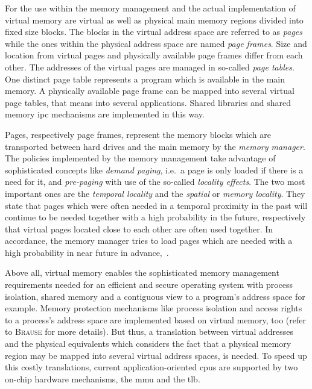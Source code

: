 %
For the use within the memory management and the actual implementation of virtual memory are virtual as well as physical main memory regions divided into fixed size blocks.
The blocks in the virtual address space are referred to as \textit{pages} while the ones within the physical address space are named \textit{page frames}.
Size and location from virtual pages and physically available page frames differ from each other. 
The addresses of the virtual pages are managed in so-called \textit{page tables}.
One distinct page table represents a program which is available in the main memory\cite{brause2017betriebssysteme}.
A physically available page frame can be mapped into several virtual page tables, that means into several applications.
Shared libraries and shared memory \ac{ipc} mechanisms are implemented in this way\cite{brause2017betriebssysteme}.

Pages, respectively page frames, represent the memory blocks which are transported between hard drives and the main memory by the \textit{memory manager}.
The policies implemented by the memory management take advantage of sophisticated concepts like \textit{demand paging}, i.e.\ a page is only loaded if there is a need for it, and \textit{pre-paging} with use of the so-called \textit{locality effects}.
The two most important ones are the \textit{temporal locality} and the \textit{spatial} or \textit{memory locality}.
They state that pages which were often needed in a temporal proximity in the past will continue to be needed together with a high probability in the future, respectively that virtual pages located close to each other are often used together.
In accordance, the memory manager tries to load pages which are needed with a high probability in near future in advance\cite{mandl2014Grundkurs},~\cite{brause2017betriebssysteme}.

Above all, virtual memory enables the sophisticated memory management requirements needed for an efficient and secure operating system with process isolation, shared memory and a contiguous view to a program's address space for example. 
Memory protection mechanisms like process isolation and access rights to a process's address space are implemented based on virtual memory, too (refer to \textsc{Brause}\cite{brause2017betriebssysteme} for more details).
But thus, a translation between virtual addresses and the physical equivalents which considers the fact that a physical memory region may be mapped into several virtual address spaces, is needed. 
To speed up this costly translations, current application-oriented \acp{cpu} are supported by two on-chip hardware mechanisms, the \acf{mmu} and the \acf{tlb}.


